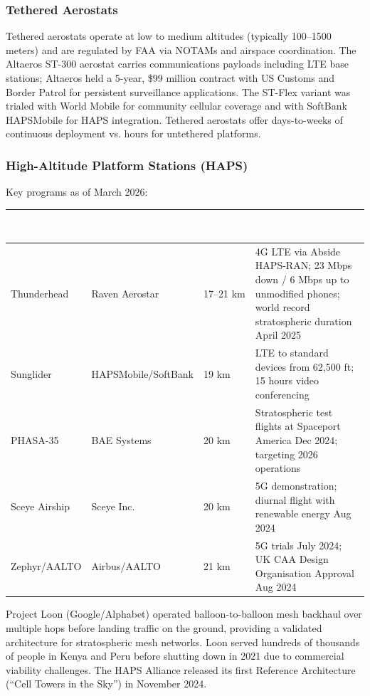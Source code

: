 \documentclass[11pt,letterpaper]{article}
\newcommand{\tableheader}[1]{\textbf{\sffamily\textcolor{white}{#1}}}
\begin{document}
\subsubsection{Tethered Aerostats}

Tethered aerostats operate at low to medium altitudes (typically 100--1500 meters) and are regulated by FAA via NOTAMs and airspace coordination. The Altaeros ST-300 aerostat carries communications payloads including LTE base stations; Altaeros held a 5-year, \$99 million contract with US Customs and Border Patrol for persistent surveillance applications. The ST-Flex variant was trialed with World Mobile for community cellular coverage and with SoftBank HAPSMobile for HAPS integration. Tethered aerostats offer days-to-weeks of continuous deployment vs. hours for untethered platforms.

\subsubsection{High-Altitude Platform Stations (HAPS)}

Key programs as of March 2026:

\begin{center}
\begin{tabularx}{\textwidth}{L{3cm}L{2.5cm}L{2cm}X}
\toprule
{}
\tableheader{Platform} & \tableheader{Developer} & \tableheader{Altitude} & \tableheader{Connectivity Demonstrated} \\
\midrule
Thunderhead & Raven Aerostar & 17--21 km & 4G LTE via Abside HAPS-RAN; 23 Mbps down / 6 Mbps up to unmodified phones; world record stratospheric duration April 2025 \\
Sunglider & HAPSMobile/SoftBank & 19 km & LTE to standard devices from 62,500 ft; 15 hours video conferencing \\
PHASA-35 & BAE Systems & 20 km & Stratospheric test flights at Spaceport America Dec 2024; targeting 2026 operations \\
Sceye Airship & Sceye Inc. & 20 km & 5G demonstration; diurnal flight with renewable energy Aug 2024 \\
Zephyr/AALTO & Airbus/AALTO & 21 km & 5G trials July 2024; UK CAA Design Organisation Approval Aug 2024 \\
\bottomrule
\end{tabularx}
\end{center}

Project Loon (Google/Alphabet) operated balloon-to-balloon mesh backhaul over multiple hops before landing traffic on the ground, providing a validated architecture for stratospheric mesh networks. Loon served hundreds of thousands of people in Kenya and Peru before shutting down in 2021 due to commercial viability challenges. The HAPS Alliance released its first Reference Architecture (``Cell Towers in the Sky'') in November 2024.
\end{document}
